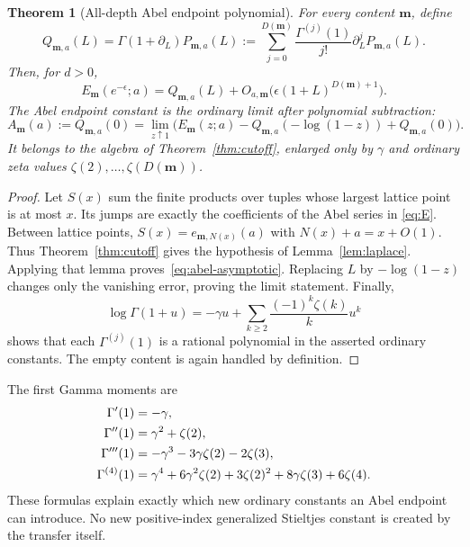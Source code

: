 \documentclass[11pt,oneside]{article}
\numberwithin{equation}{section}
\newtheorem{theorem}{Theorem}[section]
\theoremstyle{definition}
\theoremstyle{remark}
\newcommand{\mm}{\mathbf m}
\begin{document}
\begin{theorem}[All-depth Abel endpoint polynomial]\label{thm:abel}
For every content $\mm$, define
\begin{equation}\label{eq:Q}
Q_{\mm,a}(L)=\Gamma(1+\partial_L)P_{\mm,a}(L)
:=\sum_{j=0}^{D(\mm)}\frac{\Gamma^{(j)}(1)}{j!}
                         \partial_L^jP_{\mm,a}(L).
\end{equation}
Then, for $d>0$,
\begin{equation}\label{eq:abel-asymptotic}
E_{\mm}(e^{-\epsilon};a)=Q_{\mm,a}(L)
 +O_{a,\mm}\bigl(\epsilon(1+L)^{D(\mm)+1}\bigr).
\end{equation}
The Abel endpoint constant is the ordinary limit after polynomial subtraction:
\begin{equation}\label{eq:Abelconstant}
A_{\mm}(a):=Q_{\mm,a}(0)
=\lim_{z\uparrow1}\bigl(E_{\mm}(z;a)
              -Q_{\mm,a}(-\log(1-z))+Q_{\mm,a}(0)\bigr).
\end{equation}
It belongs to the algebra of Theorem~\ref{thm:cutoff}, enlarged only by
$\gamma$ and ordinary zeta values $\zeta(2),\ldots,\zeta(D(\mm))$.
\end{theorem}

\begin{proof}
Let $S(x)$ sum the finite products over tuples whose largest lattice point is
at most $x$. Its jumps are exactly the coefficients of the Abel series in
\eqref{eq:E}. Between lattice points,
$S(x)=e_{\mm,N(x)}(a)$ with $N(x)+a=x+O(1)$. Thus
Theorem~\ref{thm:cutoff} gives the hypothesis of Lemma~\ref{lem:laplace}.
Applying that lemma proves~\eqref{eq:abel-asymptotic}. Replacing $L$ by
$-\log(1-z)$ changes only the vanishing error, proving the limit statement.
Finally,
\begin{equation}\label{eq:loggamma}
\log\Gamma(1+u)=-\gamma u+
 \sum_{k\ge2}\frac{(-1)^k\zeta(k)}{k}u^k
\end{equation}
shows that each $\Gamma^{(j)}(1)$ is a rational polynomial in the asserted
ordinary constants. The empty content is again handled by definition.
\end{proof}

The first Gamma moments are
\begin{align}
\Gamma'(1)&=-\gamma,\notag\\
\Gamma''(1)&=\gamma^2+\zeta(2),\notag\\
\Gamma'''(1)&=-\gamma^3-3\gamma\zeta(2)-2\zeta(3),\notag\\
\Gamma^{(4)}(1)&=\gamma^4+6\gamma^2\zeta(2)+3\zeta(2)^2
                +8\gamma\zeta(3)+6\zeta(4).
\label{eq:gamma-moments}
\end{align}
These formulas explain exactly which new ordinary constants an Abel endpoint
can introduce. No new positive-index generalized Stieltjes constant is
created by the transfer itself.
\end{document}
